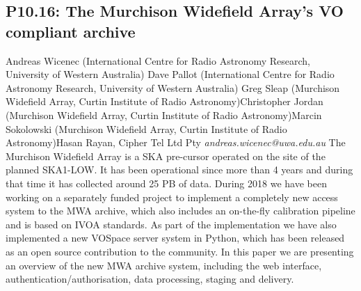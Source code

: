 \documentclass{report}
\begin{document}
\subsection*{P10.16: The Murchison Widefield Array's VO compliant archive}
\bigskip
Andreas Wicenec (International Centre for Radio Astronomy Research, University of Western Australia) \newline Dave Pallot (International Centre for Radio Astronomy Research, University of Western Australia) \newline  Greg Sleap (Murchison Widefield Array, Curtin Institute of Radio Astronomy)\newline  Christopher Jordan (Murchison Widefield Array, Curtin Institute of Radio Astronomy)\newline Marcin Sokolowski (Murchison Widefield Array, Curtin Institute of Radio Astronomy)\newline  Hasan Rayan, Cipher Tel Ltd Pty\newline\newline
{\it andreas.wicenec@uwa.edu.au}\newline
\newline\newline
The Murchison Widefield Array is a SKA pre-cursor operated on the site of the planned SKA1-LOW. It  has been operational since more than 4 years and during that time it has collected around 25 PB of data. During 2018 we have been working on a separately funded project to implement a completely new access system to the MWA archive, which also includes an on-the-fly calibration pipeline and is based on IVOA standards. As part of the implementation we have also implemented a new VOSpace server system in Python, which has been released as an open source contribution to the community. In this paper we are presenting an overview of the new MWA archive system, including the web interface, authentication/authorisation, data processing, staging and delivery.\newline
\newpage
\end{document}
